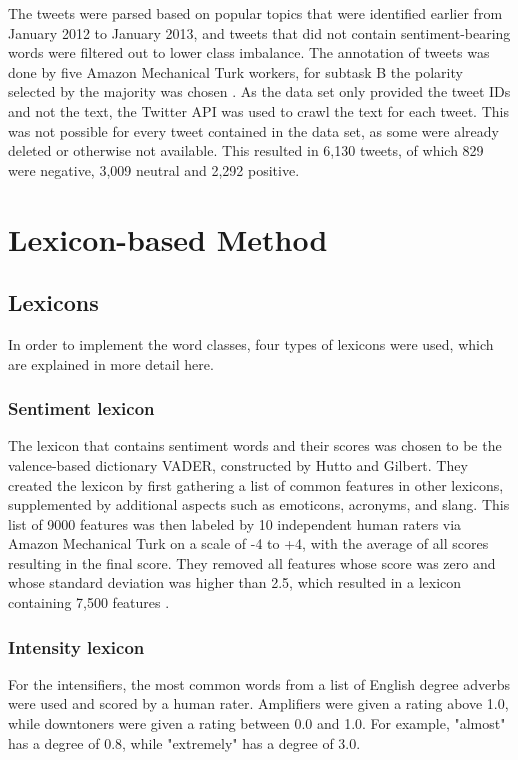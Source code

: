 The tweets were parsed based on popular topics that were identified earlier from January 2012 to January 2013, and tweets that did not contain sentiment-bearing words were filtered out to lower class imbalance. The annotation of tweets was done by five Amazon Mechanical Turk workers, for subtask B the polarity selected by the majority was chosen \cite{nakov-etal-2013-semeval}. As the data set only provided the tweet IDs and not the text, the Twitter API was used to crawl the text for each tweet. This was not possible for every tweet contained in the data set, as some were already deleted or otherwise not available. This resulted in 6,130 tweets, of which 829 were negative, 3,009 neutral and 2,292 positive.

\section{Lexicon-based Method}

\subsection{Lexicons}
In order to implement the word classes, four types of lexicons were used, which are explained in more detail here.

\subsubsection{Sentiment lexicon}
The lexicon that contains sentiment words and their scores was chosen to be the valence-based dictionary VADER, constructed by Hutto and Gilbert. They created the lexicon by first gathering a list of common features in other lexicons, supplemented by additional aspects such as emoticons, acronyms, and slang. This list of 9000 features was then labeled by 10 independent human raters via Amazon Mechanical Turk on a scale of -4 to +4, with the average of all scores resulting in the final score. They removed all features whose score was zero and whose standard deviation was higher than 2.5, which resulted in a lexicon containing 7,500 features \cite{DBLP:conf/icwsm/HuttoG14}.

\subsubsection{Intensity lexicon}
For the intensifiers, the most common words from a list of English degree adverbs \cite{wiki:adverbs} were used and scored by a human rater. Amplifiers were given a rating above 1.0, while downtoners were given a rating between 0.0 and 1.0. For example, "almost" has a degree of 0.8, while "extremely" has a degree of 3.0.


